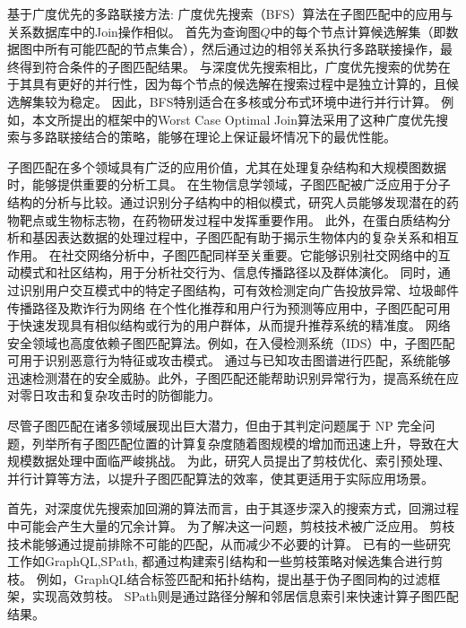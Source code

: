 基于广度优先的多路联接方法: 广度优先搜索（BFS）算法在子图匹配中的应用与关系数据库中的Join操作相似。
首先为查询图$Q$中的每个节点计算候选解集（即数据图中所有可能匹配的节点集合），然后通过边的相邻关系执行多路联接操作，最终得到符合条件的子图匹配结果。
与深度优先搜索相比，广度优先搜索的优势在于其具有更好的并行性，因为每个节点的候选解在搜索过程中是独立计算的，且候选解集较为稳定。
因此，BFS特别适合在多核或分布式环境中进行并行计算。
例如，本文所提出的框架中的Worst Case Optimal Join算法\cite{sm-bfs-DBLP:conf/focs/AtseriasGM08}采用了这种广度优先搜索与多路联接结合的策略，能够在理论上保证最坏情况下的最优性能。

子图匹配在多个领域具有广泛的应用价值，尤其在处理复杂结构和大规模图数据时，能够提供重要的分析工具。
在生物信息学领域，子图匹配被广泛应用于分子结构的分析与比较\cite{窦建凯2019单图中的近似频繁子图挖掘算法}。通过识别分子结构中的相似模式，研究人员能够发现潜在的药物靶点或生物标志物，在药物研发过程中发挥重要作用。
此外，在蛋白质结构分析和基因表达数据的处理过程中\cite{wang2023zerobind,biology-proteins-DBLP:journals/nar/XenariosSDHKE03,uniprot2017uniprot}，子图匹配有助于揭示生物体内的复杂关系和相互作用。
在社交网络分析中，子图匹配同样至关重要。它能够识别社交网络中的互动模式和社区结构，用于分析社交行为、信息传播路径以及群体演化\cite{wang2023mago}。
同时，通过识别用户交互模式中的特定子图结构，可有效检测定向广告投放异常、垃圾邮件传播路径及欺诈行为网络\cite{boshmaf2011socialbot,jiang2012isolating,wang2010don}
在个性化推荐和用户行为预测等应用中，子图匹配可用于快速发现具有相似结构或行为的用户群体，从而提升推荐系统的精准度。
网络安全领域也高度依赖子图匹配算法。例如，在入侵检测系统（IDS）中，子图匹配可用于识别恶意行为特征或攻击模式\cite{yuan2023motif}。
通过与已知攻击图谱进行匹配，系统能够迅速检测潜在的安全威胁。此外，子图匹配还能帮助识别异常行为，提高系统在应对零日攻击和复杂攻击时的防御能力。

尽管子图匹配在诸多领域展现出巨大潜力，但由于其判定问题属于 NP 完全问题，列举所有子图匹配位置的计算复杂度随着图规模的增加而迅速上升，导致在大规模数据处理中面临严峻挑战。
为此，研究人员提出了剪枝优化、索引预处理、并行计算等方法，以提升子图匹配算法的效率，使其更适用于实际应用场景。

首先，对深度优先搜索加回溯的算法而言，由于其逐步深入的搜索方式，回溯过程中可能会产生大量的冗余计算。
为了解决这一问题，剪枝技术被广泛应用。
剪枝技术能够通过提前排除不可能的匹配，从而减少不必要的计算。
已有的一些研究工作如GraphQL\cite{sm-GraphQL-DBLP:series/ads/HeS10},SPath\cite{sm-spath-DBLP:journals/pvldb/ZhaoH10},
都通过构建索引结构和一些剪枝策略对候选集合进行剪枝。
例如，GraphQL\cite{sm-GraphQL-DBLP:series/ads/HeS10}结合标签匹配和拓扑结构，提出基于伪子图同构的过滤框架，实现高效剪枝。
SPath\cite{sm-spath-DBLP:journals/pvldb/ZhaoH10}则是通过路径分解和邻居信息索引来快速计算子图匹配结果。

